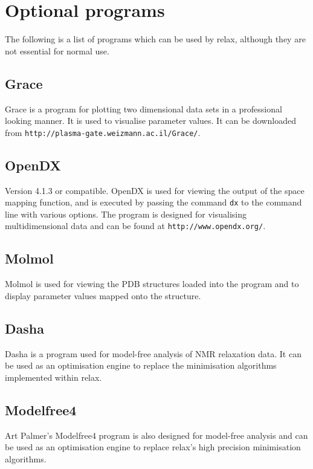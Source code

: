 
\section{Optional programs}

The following is a list of programs which can be used by relax, although they are not essential for normal use.


\subsection{Grace}

Grace is a program for plotting two dimensional data sets in a professional looking manner.  It is used to visualise parameter values.  It can be downloaded from \texttt{http://plasma-gate.weizmann.ac.il/Grace/}.


\subsection{OpenDX}

Version 4.1.3 or compatible.  OpenDX is used for viewing the output of the space mapping function, and is executed by passing the command \texttt{dx} to the command line with various options.  The program is designed for visualising multidimensional data and can be found at \texttt{http://www.opendx.org/}.


\subsection{Molmol}

Molmol is used for viewing the PDB structures loaded into the program and to display parameter values mapped onto the structure.


\subsection{Dasha}

Dasha is a program used for model-free analysis of NMR relaxation data.  It can be used as an optimisation engine to replace the minimisation algorithms implemented within relax.


\subsection{Modelfree4}

Art Palmer's Modelfree4 program is also designed for model-free analysis and can be used as an optimisation engine to replace relax's high precision minimisation algorithms.
